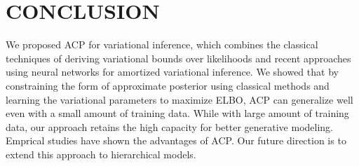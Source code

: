 
\section{CONCLUSION}
\label{diss}

We proposed ACP for variational inference, which combines the classical techniques of deriving variational bounds over likelihoods and recent approaches using neural networks for amortized variational inference. We showed that by constraining the form of approximate posterior using classical methods and learning the variational parameters to maximize ELBO, ACP can generalize well even with a small amount of training data. While with large amount of training data, our approach retains the high capacity for better generative modeling. Emprical studies have shown the advantages of ACP. Our future direction is to extend this approach to hierarchical models.